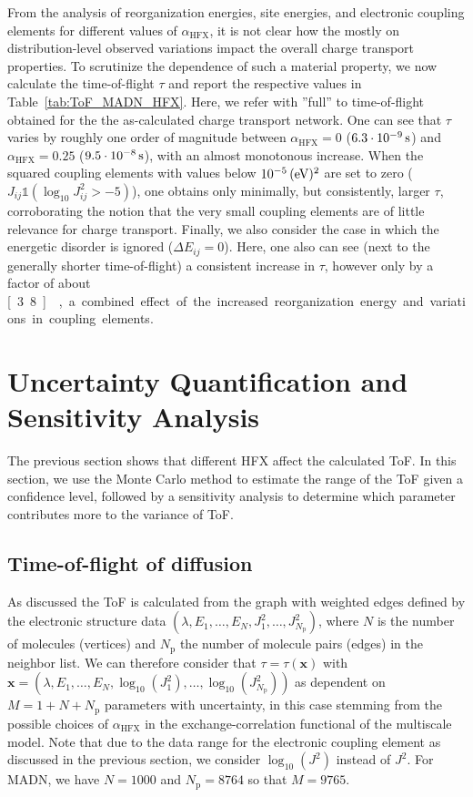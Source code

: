 \documentclass[%
 reprint,
superscriptaddress,
 amsmath,amssymb,
 aps,
prb,
floatfix
]{revtex4-2}
\newcommand{\ahfx}{\ensuremath{\alpha_\text{HFX}}\xspace}
\begin{document}
From the analysis of reorganization energies, site energies, and electronic coupling elements for different values of \ahfx, it is not clear how the mostly on distribution-level observed variations impact the overall charge transport properties. To scrutinize the dependence of such a material property, we now calculate the time-of-flight $\tau$ and report the respective values in Table~\ref{tab:ToF_MADN_HFX}. Here, we refer with ''full'' to time-of-flight obtained for the the as-calculated charge transport network. One can see that $\tau$ varies by roughly one order of magnitude between $\ahfx=0$ ($\unit[6.3\cdot 10^{-9}]{s}$) and $\ahfx=0.25$ ($\unit[9.5\cdot 10^{-8}]{s}$), with an almost monotonous increase. When the squared coupling elements with values below $\unit[10^{-5}]{(eV)^2}$ are set to zero ($J_{ij} \mathbb{1}(\log_{10} J^2_{ij} > -5)$), one obtains only minimally, but consistently, larger $\tau$, corroborating the notion that the very small coupling elements are of little relevance for charge transport. Finally, we also consider the case in which the energetic disorder is ignored ($\Delta E_{ij}=0$). Here, one also can see (next to the generally shorter time-of-flight) a consistent increase in $\tau$, however only by a factor of about \unit[3.8]{}, a combined effect of the increased reorganization energy and variations in coupling elements.




\section{Uncertainty Quantification and Sensitivity Analysis}
\label{sec:UQ}
The previous section shows that different HFX affect the calculated ToF. In this section, we use the Monte Carlo method to estimate the range of the ToF given a confidence level, followed by a sensitivity analysis to determine which parameter contributes more to the variance of ToF. 

\subsection{Time-of-flight of diffusion}
As discussed the ToF is calculated from the graph with weighted edges defined by the electronic structure data $(\lambda, E_1,\ldots,E_N, J_1^2,\ldots,J_{N_\text{p}}^2)$, where $N$ is the number of molecules (vertices) and $N_\text{p}$ the number of molecule pairs (edges) in the neighbor list. We can therefore consider that $\tau = \tau(\mathbf{x})$ with $\mathbf{x}=(\lambda, E_1,\ldots,E_N, \log_{10}(J_1^2),\ldots,\log_{10}(J_{N_\text{p}}^2))$ as dependent on $M = 1+N+N_\text{p}$ parameters with uncertainty, in this case stemming from the possible choices of \ahfx in the exchange-correlation functional of the multiscale model. Note that due to the data range for the electronic coupling element as discussed in the previous section, we consider $\log_{10}(J^2)$ instead of $J^2$. For MADN, we have $N=1000$ and $N_\text{p}=8764$ so that $M=9765$.
\end{document}
